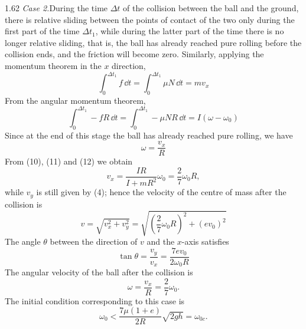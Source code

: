 \begin{solution}{1.62}
\textit{Case 2.}\quad During the time $\Delta t$ of the collision between the ball and the ground, there is relative sliding between the points of contact of the two only during the first part of the time $\Delta t_1$, while during the latter part of the time there is no longer relative sliding, that is, the ball has already reached pure rolling before the collision ends, and the friction will become zero. Similarly, applying the momentum theorem in the $x$ direction,
\begin{equation}
\int_0^{\Delta t_1}f\,\dd t=\int_0^{\Delta t_1}\mu N\,\dd t=mv_x \tag{10}
\end{equation}
From the angular momentum theorem,
\begin{equation}
\int_0^{\Delta t_1}-fR\,\dd t=\int_0^{\Delta t_1}-\mu NR\,\dd t=I\left(\omega-\omega_0\right) \tag{11}
\end{equation}
Since at the end of this stage the ball has already reached pure rolling, we have
\begin{equation}
\omega=\frac{v_x}{R} \tag{12}
\end{equation}
From (10), (11) and (12) we obtain
\[
v_x=\frac{IR}{I+mR^2}\omega_0=\frac{2}{7}\omega_0R,
\]
while $v_y$ is still given by (4); hence the velocity of the centre of mass after the collision is
\begin{equation}
v=\sqrt{v_x^2+v_y^2}=\sqrt{\left(\frac{2}{7}\omega_0R\right)^2+\left(ev_0\right)^2} \tag{13}
\end{equation}
The angle $\theta$ between the direction of $v$ and the $x$-axis satisfies
\begin{equation}
\tan\theta=\frac{v_y}{v_x}=\frac{7ev_0}{2\omega_0R} \tag{14}
\end{equation}
The angular velocity of the ball after the collision is
\[
\omega=\frac{v_x}{R}=\frac{2}{7}\omega_0 .
\]
The initial condition corresponding to this case is
\[
\omega_0<\frac{7\mu(1+e)}{2R}\sqrt{2gh}=\omega_{0c}.
\]


\end{solution}
